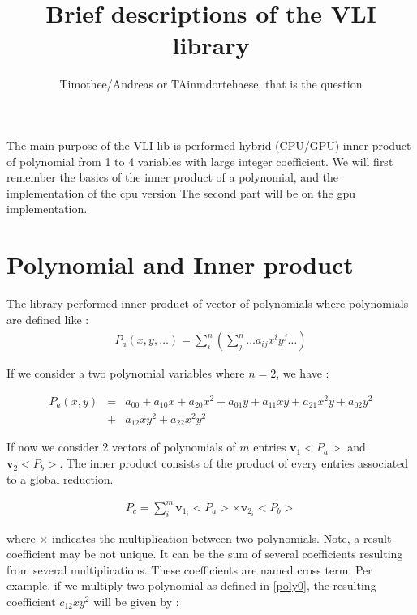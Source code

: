\documentclass[11pt]{amsart}
\title{Brief descriptions of the VLI library}
\author{Timothee/Andreas or TAinmdortehaese, that is the question}
\begin{document}
\maketitle


The main purpose of the VLI lib is performed hybrid (CPU/GPU) inner product of polynomial from 1 to 4 variables with large integer coefficient. We will first remember the basics of the inner product of a polynomial, 
and the implementation of the cpu version  The second part will be on the gpu implementation.

\section*{Polynomial and Inner product}

The library performed inner product of vector of polynomials where polynomials are defined like :
\begin{eqnarray}
P_a(x,y,\dots) = \sum_i^n \left( \sum_j^n \dots a_{ij} x^i y^j \dots \right)
\end{eqnarray}

 If we consider a two  polynomial variables where $n=2$, we  have :

\begin{eqnarray}
P_a(x,y) &=&   a_{00} + a_{10}x + a_{20}x^2 + a_{01}y + a_{11} xy + a_{21}x^2y +  a_{02}y^2  \\
              &+ & a_{12}xy^2 + a_{22}x^2y^2 \nonumber \label{poly0}
\end{eqnarray}
 
 If now we consider 2 vectors of polynomials of $m$ entries  $\boldsymbol{v}_1<P_a>$ and  $\boldsymbol{v}_2<P_b>$. The inner product  consists of the product 
 of every entries  associated to a global reduction. 
 
 \begin{eqnarray}
 P_c = \sum_i^m \boldsymbol{v}_{1_i}<P_a>  \times  \boldsymbol{v}_{2_i}<P_b> \label{poly1}
\end{eqnarray}

where $\times$ indicates the multiplication between two polynomials.   Note, a result coefficient may be not unique. It can be the sum of several coefficients resulting from several multiplications.
These coefficients are named cross term. Per example, if we multiply two polynomial as defined in \ref{poly0}, the resulting coefficient $c_{12}xy^2$ will be given by : 
\end{document}
